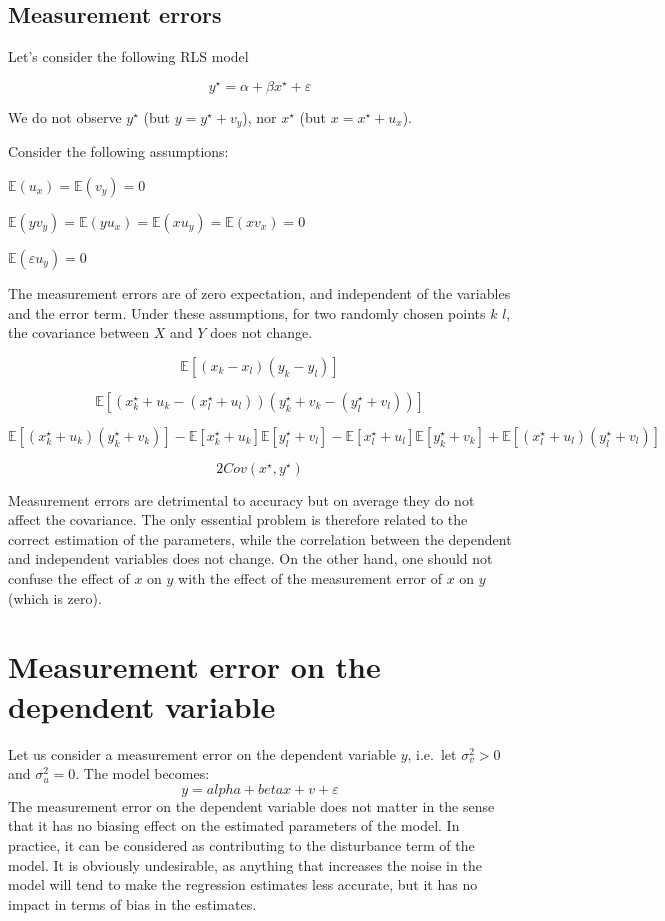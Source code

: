 \documentclass[
]{report}
\begin{document}
\hypertarget{measurement-errors}{%
\subsection{Measurement errors}\label{measurement-errors}}

Let's consider the following RLS model

\[y^{\star}=\alpha+\beta x^{\star}+\varepsilon\]

We do not observe \(y^{\star}\) (but \(y=y^{\star}+v_y\)), nor \(x^{\star}\) (but \(x=x^{\star}+u_x\)).

Consider the following assumptions:

\(\mathbb{E}(u_x)=\mathbb{E}(v_y)=0\)

\(\mathbb{E}(y v_y)=\mathbb{E}(y u_x)=\mathbb{E}(x u_y)=\mathbb{E}(x v_x)=0\)

\(\mathbb{E}(\varepsilon u_y)=0\)

The measurement errors are of zero expectation, and independent of the variables and the error term.
Under these assumptions, for two randomly chosen points \(k\) \(l\), the covariance between \(X\) and \(Y\) does not change.

\[\mathbb{E}[(x_k-x_l)(y_k-y_l)]\]

\[\mathbb{E}[(x_k^{\star}+u_k-(x_l^{\star}+u_l))(y_k^{\star}+v_k-(y_l^{\star}+v_l))]\]

\[\mathbb{E}[(x_k^{\star}+u_k)(y_k^{\star}+v_k)] -\mathbb{E}[x_k^{\star}+u_k]\mathbb{E}[y_l^{\star}+v_l] -\mathbb{E}[x_l^{\star}+u_l]\mathbb{E}[y_k^{\star}+v_k]+ \mathbb{E}[(x_l^{\star}+u_l)(y_l^{\star}+v_l)]\]

\[2Cov(x^{\star},y^{\star})\]

Measurement errors are detrimental to accuracy but on average they do not affect the covariance. The only essential problem is therefore related to the correct estimation of the parameters, while the correlation between the dependent and independent variables does not change. On the other hand, one should not confuse the effect of \(x\) on \(y\) with the effect of the measurement error of \(x\) on \(y\) (which is zero).

\hypertarget{measurement-error-on-the-dependent-variable}{%
\section{Measurement error on the dependent variable}\label{measurement-error-on-the-dependent-variable}}

Let us consider a measurement error on the dependent variable \(y\), i.e.~let \(\sigma_v^2 > 0\) and \(\sigma_u^2 = 0\). The model becomes:
\[y=alpha+beta x + v+ \varepsilon\]
The measurement error on the dependent variable does not matter in the sense that it has no biasing effect on the estimated parameters of the model. In practice, it can be considered as contributing to the disturbance term of the model. It is obviously undesirable, as anything that increases the noise in the model will tend to make the regression estimates less accurate, but it has no impact in terms of bias in the estimates.
\end{document}
